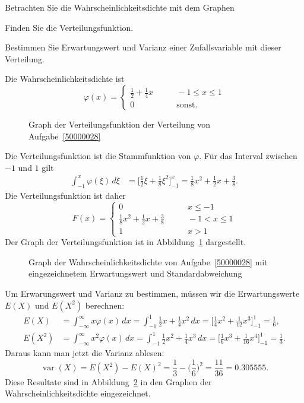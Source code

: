 Betrachten Sie die Wahrscheinlichkeitsdichte mit dem Graphen
\begin{center}
\end{center}
\begin{teilaufgaben}
\item Finden Sie die Verteilungsfunktion.
\item Bestimmen Sie Erwartungswert und Varianz einer Zufallsvariable
mit dieser Verteilung.
\end{teilaufgaben}

\begin{loesung}
Die Wahrscheinlichkeitsdichte ist 
\[
\varphi(x)=\begin{cases}
\frac12+\frac14x&\qquad -1\le x\le 1\\
0&\qquad\text{sonst.}
\end{cases}
\]
\begin{teilaufgaben}
\item
\begin{figure}
\centering
{}
\caption{Graph der Verteilungsfunktion der Verteilung von
Aufgabe~\ref{50000028}
\label{50000028:verteilungsfunktion}}
\end{figure}
Die Verteilungsfunktion ist die Stammfunktion von $\varphi$.
Für das Interval zwischen $-1$ und $1$ gilt
\begin{align*}
\int_{-1}^x\varphi(\xi)\,d\xi
&=
\biggl[\frac12 \xi+\frac18\xi^2\biggr]_{-1}^x
=
\frac18x^2+\frac12x+\frac{3}{8}.
\end{align*}
Die Verteilungsfunktion ist daher
\[
F(x)=\begin{cases}
0&\qquad x \le -1\\
\frac18x^2+\frac12x+\frac{3}{8}
&\qquad -1 < x\le 1\\
1&\qquad x >1
\end{cases}
\]
Der Graph der Verteilungsfunktion ist in
Abbildung~\ref{50000028:verteilungsfunktion} dargestellt.
\item
\begin{figure}
\centering
{}
\caption{Graph der Wahrscheinlichkeitsdichte von Aufgabe~\ref{50000028}
mit eingezeichnetem Erwartungswert und Standardabweichung
\label{50000028:varianz}}
\end{figure}
Um Erwarungswert und Varianz zu bestimmen, müssen wir die Erwartungswerte
$E(X)$ und $E(X^2)$ berechnen:
\begin{align*}
E(X)&=
\int_{-\infty}^\infty x\varphi(x)\,dx
=
\int_{-1}^{1}
\frac12x+\frac14x^2
\,dx
=
\biggl[
\frac14x^2+\frac1{12}x^3
\biggr]_{-1}^{1}
=\frac1{6},
\\
E(X^2)
&=
\int_{-\infty}^\infty x^2\varphi(x)\,dx
=
\int_{-1}^{1}
\frac12x^2+\frac14x^3
\,dx
=
\biggl[
\frac16x^3+\frac1{16}x^4
\biggr]_{-1}^{1}
=\frac1{3}.
\end{align*}
Daraus kann man jetzt die Varianz ablesen:
\[
\operatorname{var}(X) = E(X^2)-E(X)^2=\frac1{3}-\biggl(\frac1{6}\biggr)^2
=\frac{11}{36}=0.305555.
\]
Diese Resultate sind in Abbildung~\ref{50000028:varianz} in den Graphen
der Wahrscheinlichkeitsdichte eingezeichnet.
\qedhere
\end{teilaufgaben}
\end{loesung}

